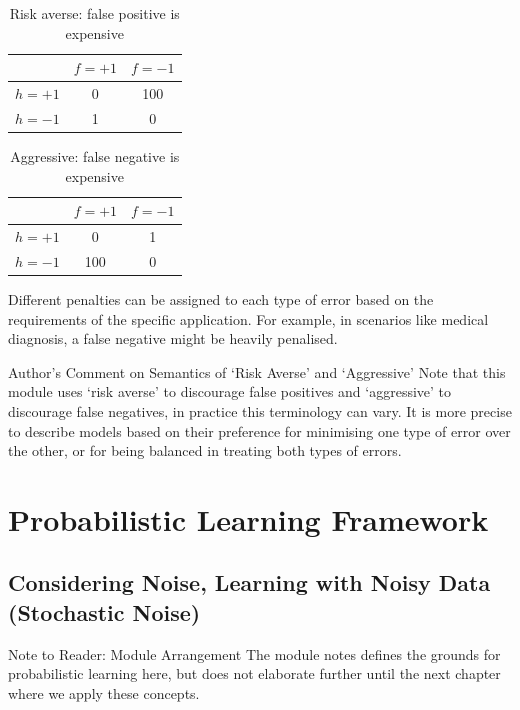 \begin{table}[H]
\centering
\begin{tabular}{|c|c|c|}
\hline
& $f = +1$ & $f = -1$ \\
\hline
$h = +1$ & 0 & 100 \\
\hline
$h = -1$ & 1 & 0 \\
\hline
\end{tabular}
\caption{Risk averse: false positive is expensive}
\end{table}

\begin{table}[H]
\centering
\begin{tabular}{|c|c|c|}
\hline
& $f = +1$ & $f = -1$ \\
\hline
$h = +1$ & 0 & 1 \\
\hline
$h = -1$ & 100 & 0 \\
\hline
\end{tabular}
\caption{Aggressive: false negative is expensive}
\end{table}



Different penalties can be assigned to each type of error based on the requirements of the specific application. For example, in scenarios like medical diagnosis, a false negative might be heavily penalised.

\begin{commentbox}{Author's Comment on Semantics of `Risk Averse' and `Aggressive'}
    Note that this module uses `risk averse' to discourage false positives and `aggressive' to discourage false negatives, in practice this terminology can vary. It is more precise to describe models based on their preference for minimising one type of error over the other, or for being balanced in treating both types of errors.
\end{commentbox}



\section{Probabilistic Learning Framework}
\subsection{Considering Noise, Learning with Noisy Data (Stochastic Noise)}\label{learning_with_noise}
\begin{commentbox}{Note to Reader: Module Arrangement}
    The module notes defines the grounds for probabilistic learning here, but does not elaborate further until the next chapter where we apply these concepts.
\end{commentbox}


